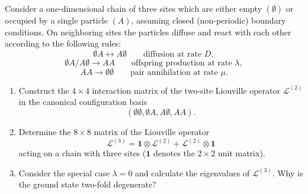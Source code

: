 \begin{Problem}
Consider a one-dimensional chain of three sites which are either empty $(\emptyset)$ or occupied by a single particle $(A)$, assuming closed (non-periodic) boundary conditions. On neighboring sites the particles diffuse and react with each other according to the following rules:
\[
\emptyset A \leftrightarrow A \emptyset
\qquad \text{diffusion at rate } D,
\]
\[
\emptyset A / A\emptyset \to AA
\qquad \text{offspring production at rate } \lambda,
\]
\[
AA \to \emptyset\emptyset
\qquad \text{pair annihilation at rate } \mu.
\]

\begin{enumerate}
    \item[(a)] Construct the $4 \times 4$ interaction matrix of the two-site Liouville operator $\mathcal{L}^{(2)}$ in the canonical configuration basis
    \[
    (\emptyset\emptyset,\emptyset A,A\emptyset,AA).
    \]

    \item[(b)] Determine the $8 \times 8$ matrix of the Liouville operator
    \[
    \mathcal{L}^{(3)}
    =
    \mathbf{1}\otimes \mathcal{L}^{(2)}
    +
    \mathcal{L}^{(2)} \otimes \mathbf{1}
    \]
    acting on a chain with three sites
    ($\mathbf{1}$ denotes the $2\times 2$ unit matrix).

    \item[(c)] Consider the special case $\lambda = 0$ and calculate the eigenvalues of $\mathcal{L}^{(3)}$. Why is the ground state two-fold degenerate?
\end{enumerate}
\end{Problem}
